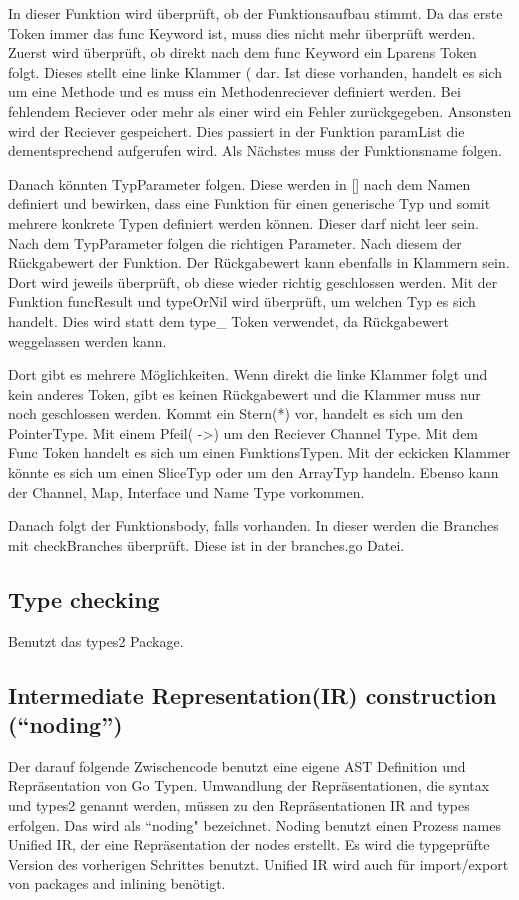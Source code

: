 In dieser Funktion wird überprüft, ob der Funktionsaufbau stimmt. Da das erste Token immer das func Keyword ist, muss dies nicht mehr überprüft werden. Zuerst wird überprüft, ob direkt nach dem func Keyword ein Lparens Token folgt. Dieses stellt eine linke Klammer ( dar. Ist diese vorhanden, handelt es sich um eine Methode und es muss ein Methodenreciever definiert werden. Bei fehlendem Reciever oder mehr als einer wird ein Fehler zurückgegeben. Ansonsten wird der Reciever gespeichert. Dies passiert in der Funktion paramList die dementsprechend aufgerufen wird.
Als Nächstes muss der Funktionsname folgen. 

Danach könnten TypParameter folgen. Diese werden in [] nach dem Namen definiert und bewirken, dass eine Funktion für einen generische Typ und somit mehrere konkrete Typen definiert werden können. Dieser darf nicht leer sein. Nach dem TypParameter folgen die richtigen Parameter. Nach diesem der Rückgabewert der Funktion. Der Rückgabewert kann ebenfalls in Klammern sein. Dort wird jeweils überprüft, ob diese wieder richtig geschlossen werden. Mit der Funktion funcResult und typeOrNil wird überprüft, um welchen Typ es sich handelt. Dies wird statt dem type\_ Token verwendet, da Rückgabewert weggelassen werden kann. 

Dort gibt es mehrere Möglichkeiten. Wenn direkt die linke Klammer folgt und kein anderes Token, gibt es keinen Rückgabewert und die Klammer muss nur noch geschlossen werden. Kommt ein Stern(*) vor, handelt es sich um den PointerType. Mit einem Pfeil( ->) um den Reciever Channel Type. Mit dem Func Token handelt es sich um einen FunktionsTypen. Mit der eckicken Klammer könnte es sich um einen SliceTyp oder um den ArrayTyp handeln. Ebenso kann der Channel, Map, Interface und Name Type vorkommen. 

Danach folgt der Funktionsbody, falls vorhanden. In dieser werden die Branches mit checkBranches überprüft. Diese ist in der branches.go Datei. 

\subsection{Type checking}
Benutzt das types2 Package.
\subsection{Intermediate Representation(IR) construction (“noding”)}
Der darauf folgende Zwischencode benutzt eine eigene AST Definition und Repräsentation von Go Typen. Umwandlung der Repräsentationen, die  syntax und types2 genannt werden, müssen zu den Repräsentationen IR and types erfolgen. Das wird als “noding" bezeichnet.
Noding benutzt einen Prozess names Unified IR, der eine Repräsentation der nodes erstellt. Es wird die typgeprüfte Version des vorherigen Schrittes benutzt. Unified IR wird auch für import/export von packages and inlining benötigt.
